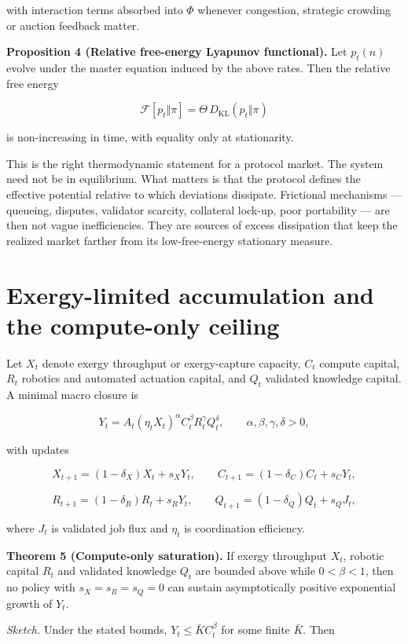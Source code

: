 with interaction terms absorbed into \(\Phi\) whenever congestion,
strategic crowding or auction feedback matter.

\textbf{Proposition 4 (Relative free-energy Lyapunov functional).} Let
\(p_t(n)\) evolve under the master equation induced by the above rates.
Then the relative free energy

\[
\mathscr{F}[p_t\Vert \pi] = \Theta\,D_{\mathrm{KL}}(p_t\Vert \pi)
\]

is non-increasing in time, with equality only at stationarity.

This is the right thermodynamic statement for a protocol market. The
system need not be in equilibrium. What matters is that the protocol
defines the effective potential relative to which deviations dissipate.
Frictional mechanisms --- queueing, disputes, validator scarcity,
collateral lock-up, poor portability --- are then not vague
inefficiencies. They are sources of excess dissipation that keep the
realized market farther from its low-free-energy stationary measure.

\section{Exergy-limited accumulation and the compute-only
ceiling}\label{exergy-limited-accumulation-and-the-compute-only-ceiling}

Let \(X_t\) denote exergy throughput or exergy-capture capacity, \(C_t\)
compute capital, \(R_t\) robotics and automated actuation capital, and
\(Q_t\) validated knowledge capital. A minimal macro closure is

\[
Y_t = A_t(\eta_t X_t)^{\alpha} C_t^{\beta} R_t^{\gamma} Q_t^{\delta},
\qquad \alpha,\beta,\gamma,\delta>0,
\]

with updates

\[
X_{t+1}=(1-\delta_X)X_t+s_XY_t, \qquad
C_{t+1}=(1-\delta_C)C_t+s_CY_t,
\]

\[
R_{t+1}=(1-\delta_R)R_t+s_RY_t, \qquad
Q_{t+1}=(1-\delta_Q)Q_t+s_QJ_t,
\]

where \(J_t\) is validated job flux and \(\eta_t\) is coordination
efficiency.

\textbf{Theorem 5 (Compute-only saturation).} If exergy throughput
\(X_t\), robotic capital \(R_t\) and validated knowledge \(Q_t\) are
bounded above while \(0<\beta<1\), then no policy with \(s_X=s_R=s_Q=0\)
can sustain asymptotically positive exponential growth of \(Y_t\).

\emph{Sketch.} Under the stated bounds, \(Y_t \le \bar K C_t^{\beta}\)
for some finite \(\bar K\). Then

